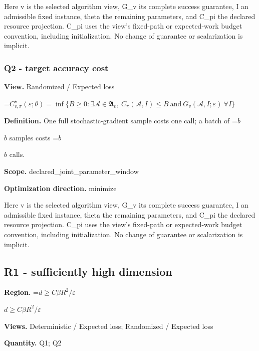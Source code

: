 \documentclass[10pt,a4paper]{article}
\newcommand{\AtlasMath}[1]{\par\begingroup\centering\setbox0=\hbox{$\displaystyle #1$}\ifdim\wd0>1.4\linewidth\typeout{ATLAS WIDE FORMULA: \the\wd0}\fi\ifdim\wd0>\linewidth\resizebox{\linewidth}{!}{\box0}\else\box0\fi\par\endgroup}
\newcommand{\AtlasInlineMath}[1]{\begingroup\setbox0=\hbox{$#1$}\ifdim\wd0>.4\linewidth\endgroup\AtlasMath{#1}\else\endgroup$#1$\fi}
\begin{document}
Here v is the selected algorithm view, G\_v its complete success guarantee, I an admissible fixed instance, theta the remaining parameters, and C\_pi the declared resource projection. C\_pi uses the view's fixed-path or expected-work budget convention, including initialization. No change of guarantee or scalarization is implicit.



\subsubsection{Q2 - target accuracy cost}


\textbf{View.} Randomized / Expected loss



\AtlasMath{C^\star_{v,\pi}(\varepsilon;\theta)=\inf\{B\ge0:\exists\mathcal A\in\mathfrak A_v,\ C_\pi(\mathcal A,I)\le B\ \text{and}\ G_v(\mathcal A,I;\varepsilon)\ \forall I\}}


\textbf{Definition.} One full stochastic-gradient sample costs one call; a batch of \AtlasInlineMath{b} samples costs \AtlasInlineMath{b} calls.



\textbf{Scope.} declared\_joint\_parameter\_window



\textbf{Optimization direction.} minimize



Here v is the selected algorithm view, G\_v its complete success guarantee, I an admissible fixed instance, theta the remaining parameters, and C\_pi the declared resource projection. C\_pi uses the view's fixed-path or expected-work budget convention, including initialization. No change of guarantee or scalarization is implicit.



\subsection{R1 - sufficiently high dimension}


\textbf{Region.} \AtlasInlineMath{d\ge C\beta R^2/\varepsilon}



\textbf{Views.} Deterministic / Expected loss; Randomized / Expected loss



\textbf{Quantity.} Q1; Q2
\end{document}
